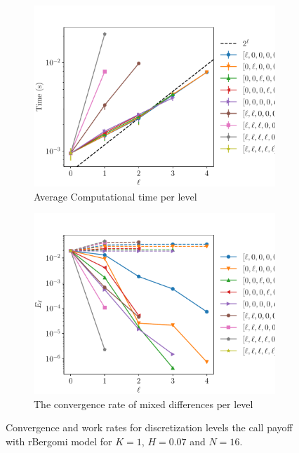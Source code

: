 \documentclass[11pt]{article}
\begin{document}
\begin{figure}[!h]
	\centering
	\begin{subfigure}{.4\textwidth}
		\centering
		\includegraphics[width=0.95\linewidth]{./figures/bergomi_misc/H_007/N_16/level_work.pdf}
		\caption{Average Computational time per level}
		\label{fig:misc_rbergomi_8_steps_sub3}
	\end{subfigure}%
	\begin{subfigure}{.4\textwidth}
		\centering
		\includegraphics[width=0.95\linewidth]{./figures/bergomi_misc/H_007/N_16/levels_error_rate.pdf}
		\caption{  The convergence rate of mixed differences per level}
		\label{fig:misc_rbergomi_8_steps_sub4}
	\end{subfigure}%
	\caption{Convergence and work rates for discretization levels  the call payoff with rBergomi model for $K=1$, $H=0.07$ and $N=16$.}
	\label{fig:misc_rbergomi_8_steps_2}
\end{figure}





%
\end{document}
